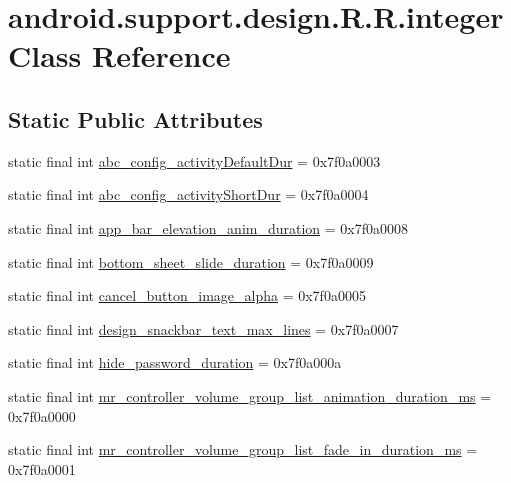 \hypertarget{classandroid_1_1support_1_1design_1_1_r_1_1integer}{
\section{android.support.design.R.R.integer Class Reference}
\label{classandroid_1_1support_1_1design_1_1_r_1_1integer}
}
\subsection*{Static Public Attributes}
\begin{CompactItemize}
\item 
static final int \hyperlink{classandroid_1_1support_1_1design_1_1_r_1_1integer_4f646b35a3d2dda8de5198b44459dbe3}{abc\_\-config\_\-activityDefaultDur} = 0x7f0a0003
\item 
static final int \hyperlink{classandroid_1_1support_1_1design_1_1_r_1_1integer_2f5425c28deda3c5aceb1e08b0a4be04}{abc\_\-config\_\-activityShortDur} = 0x7f0a0004
\item 
static final int \hyperlink{classandroid_1_1support_1_1design_1_1_r_1_1integer_b21a5c7ffb69fde8a48818b5855ff94f}{app\_\-bar\_\-elevation\_\-anim\_\-duration} = 0x7f0a0008
\item 
static final int \hyperlink{classandroid_1_1support_1_1design_1_1_r_1_1integer_1550e31fb73b8a9dbc81dfa9b7c44225}{bottom\_\-sheet\_\-slide\_\-duration} = 0x7f0a0009
\item 
static final int \hyperlink{classandroid_1_1support_1_1design_1_1_r_1_1integer_9e16cd867d2cb52018744105204bdcd8}{cancel\_\-button\_\-image\_\-alpha} = 0x7f0a0005
\item 
static final int \hyperlink{classandroid_1_1support_1_1design_1_1_r_1_1integer_7fb194a3d4710582eb3e02127caa7cf4}{design\_\-snackbar\_\-text\_\-max\_\-lines} = 0x7f0a0007
\item 
static final int \hyperlink{classandroid_1_1support_1_1design_1_1_r_1_1integer_85551b23e892cc6489a7655a2f6b15d4}{hide\_\-password\_\-duration} = 0x7f0a000a
\item 
static final int \hyperlink{classandroid_1_1support_1_1design_1_1_r_1_1integer_f757b6f74dacefdccfd8179cb4a9d569}{mr\_\-controller\_\-volume\_\-group\_\-list\_\-animation\_\-duration\_\-ms} = 0x7f0a0000
\item 
static final int \hyperlink{classandroid_1_1support_1_1design_1_1_r_1_1integer_5888925a302214c9b885016cdb3b41bc}{mr\_\-controller\_\-volume\_\-group\_\-list\_\-fade\_\-in\_\-duration\_\-ms} = 0x7f0a0001

\end{CompactItemize}
